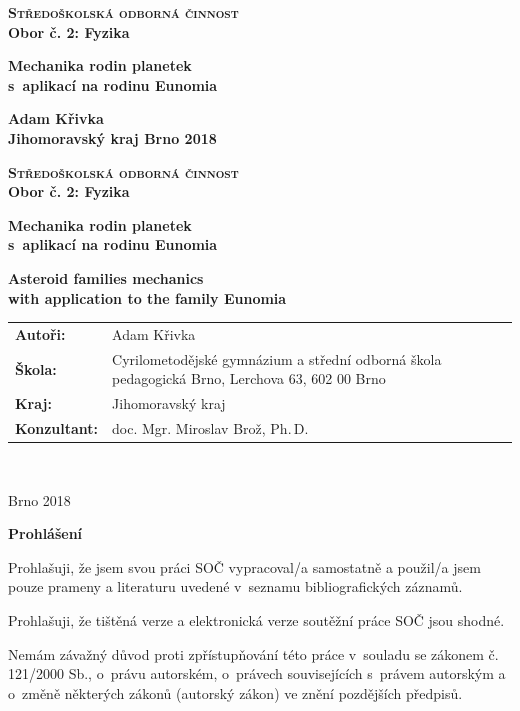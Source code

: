 \documentclass[A4paper, 12pt, oneside]{book}%
\newcommand{\B}[1]{\textbf{#1}}
\renewcommand{\S}[1]{\textsc{#1}}
\begin{document}
\begin{center}
	{\LARGE \B{\S{Středoškolská odborná činnost}}} \\
	{\large \B{{Obor č. 2: Fyzika}}}
\end{center}
\vfill
\begin{center}
	{\Huge \B{Mechanika rodin planetek \\ s~aplikací na rodinu Eunomia}}
\end{center}
\vfill
{\large \bfseries Adam Křivka \\
	Jihomoravský kraj \hfill Brno 2018}

\newpage

\begin{center}
	{\LARGE \B{\S{Středoškolská odborná činnost}}} \\
	{\large \B{{Obor č. 2: Fyzika}}}
\end{center}
\vfill
\begin{center}
	{\Huge \B{Mechanika rodin planetek \\ s~aplikací na rodinu Eunomia}}

	{\Huge \B{Asteroid families mechanics \\ with application to the family Eunomia}}
\end{center}
\vfill
\begin{tabularx}{\textwidth}{lX}
	{\bfseries Autoři:} & Adam Křivka \\
	{\bfseries Škola:} & Cyrilometodějské gymnázium a střední odborná škola pedagogická Brno, Lerchova 63, 602 00 Brno \\
	{\bfseries Kraj:} & Jihomoravský kraj \\
	{\bfseries Konzultant:} & doc. Mgr. Miroslav Brož, Ph.\,D.
\end{tabularx}

\

\noindent Brno 2018

\newpage

{\large \bfseries Prohlášení}

Prohlašuji, že jsem svou práci SOČ vypracoval/a samostatně a použil/a jsem pouze prameny a literaturu uvedené v~seznamu bibliografických záznamů.

Prohlašuji, že tištěná verze a elektronická verze soutěžní práce SOČ jsou shodné. 

Nemám závažný důvod proti zpřístupňování této práce v~souladu se zákonem č. 121/2000 Sb., o~právu autorském, o~právech souvisejících s~právem autorským a o~změně některých zákonů (autorský zákon) ve znění pozdějších předpisů. 
\end{document}
